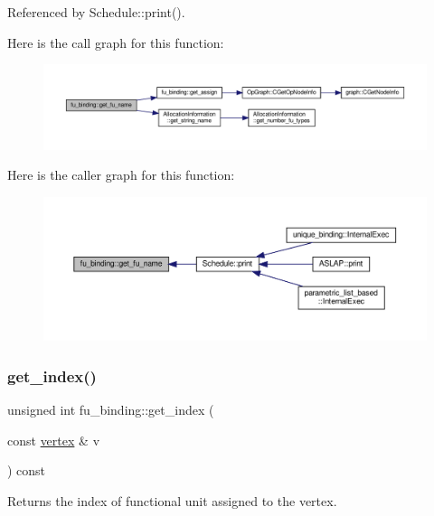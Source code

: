 Referenced by Schedule\+::print().

Here is the call graph for this function\+:
\nopagebreak
\begin{figure}[H]
\begin{center}
\leavevmode
\includegraphics[width=350pt]{d8/d04/classfu__binding_a92729622430342e6827ecb5398a71379_cgraph}
\end{center}
\end{figure}
Here is the caller graph for this function\+:
\nopagebreak
\begin{figure}[H]
\begin{center}
\leavevmode
\includegraphics[width=350pt]{d8/d04/classfu__binding_a92729622430342e6827ecb5398a71379_icgraph}
\end{center}
\end{figure}
\mbox{\label{classfu__binding_aaf7a77c359203fa9866bc452550891e5}} 
\subsubsection{\texorpdfstring{get\+\_\+index()}{get\_index()}}
{\footnotesize\ttfamily unsigned int fu\+\_\+binding\+::get\+\_\+index (\begin{DoxyParamCaption}\item[{const \hyperlink{graph_8hpp_abefdcf0544e601805af44eca032cca14}{vertex} \&}]{v }\end{DoxyParamCaption}) const}



Returns the index of functional unit assigned to the vertex. 


